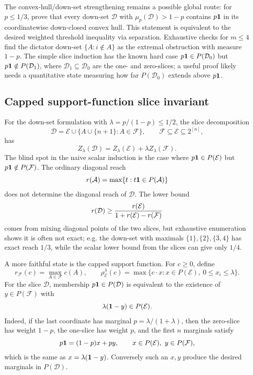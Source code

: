 \documentclass[12pt]{article}
\begin{document}
The convex-hull/down-set strengthening remains a possible global route:
for \(p\le1/3\), prove that every down-set \(\mathcal D\) with
\(\mu_p(\mathcal D)>1-p\) contains \(p{\bf1}\) in its coordinatewise
down-closed convex hull.  This statement is equivalent to the desired weighted
threshold inequality via separation.  Exhaustive checks for \(m\le4\) find the
dictator down-set \(\{A:i\notin A\}\) as the extremal obstruction with measure
\(1-p\).  The simple slice induction has the known hard case
\(p{\bf1}\in P(\mathcal D_0)\) but \(p{\bf1}\notin P(\mathcal D_1)\), where
\(\mathcal D_1\subseteq\mathcal D_0\) are the one- and zero-slices; a useful
proof likely needs a quantitative state measuring how far \(P(\mathcal D_0)\)
extends above \(p{\bf1}\).



\subsection*{Capped support-function slice invariant}

For the down-set formulation with \(\lambda=p/(1-p)\le 1/2\), the slice
decomposition
\[
  \mathcal D=\mathcal E\cup\{A\cup\{n+1\}:A\in\mathcal F\},\qquad
  \mathcal F\subseteq\mathcal E\subseteq 2^{[n]},
\]
has
\[
  Z_\lambda(\mathcal D)=Z_\lambda(\mathcal E)+\lambda Z_\lambda(\mathcal F).
\]
The blind spot in the naive scalar induction is the case where
\(p{\bf1}\in P(\mathcal E)\) but \(p{\bf1}\notin P(\mathcal F)\).  The ordinary
diagonal reach
\[
  r(\mathcal A)=\max\{t:t{\bf1}\in P(\mathcal A)\}
\]
does not determine the diagonal reach of \(\mathcal D\).  The lower bound
\[
  r(\mathcal D)\ge {r(\mathcal E)\over 1+r(\mathcal E)-r(\mathcal F)}
\]
comes from mixing diagonal points of the two slices, but exhaustive enumeration
shows it is often not exact; e.g. the down-set with maximals
\(\{1\},\{2\},\{3,4\}\) has exact reach \(1/3\), while the scalar lower bound
from the slices can give only \(1/4\).

A more faithful state is the capped support function.  For \(c\ge0\), define
\[
  r_{\mathcal F}(c)=\max_{A\in\mathcal F}c(A),\qquad
  \rho^\lambda_{\mathcal E}(c)=
  \max\{c\cdot x:x\in P(\mathcal E),\ 0\le x_i\le\lambda\}.
\]
For the slice \(\mathcal D\), membership \(p{\bf1}\in P(\mathcal D)\) is
equivalent to the existence of \(y\in P(\mathcal F)\) with
\[
   \lambda({\bf1}-y)\in P(\mathcal E).
\]
Indeed, if the last coordinate has marginal \(p=\lambda/(1+\lambda)\), then the
zero-slice has weight \(1-p\), the one-slice has weight \(p\), and the first
\(n\) marginals satisfy
\[
  p{\bf1}=(1-p)x+p y,\qquad x\in P(\mathcal E),\ y\in P(\mathcal F),
\]
which is the same as \(x=\lambda({\bf1}-y)\).  Conversely such an \(x,y\)
produce the desired marginals in \(P(\mathcal D)\).
\end{document}
